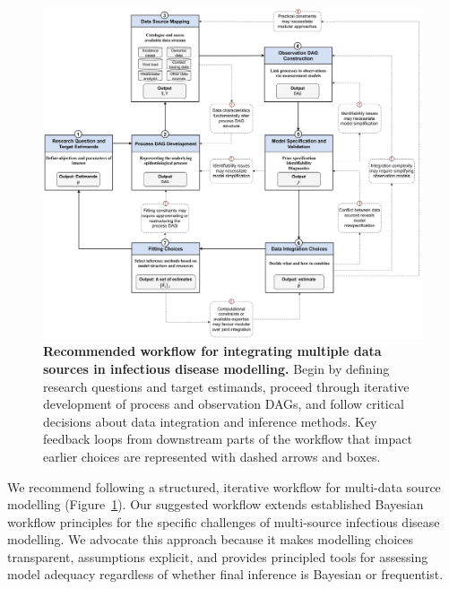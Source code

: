 \documentclass{article}
\begin{document}
\begin{figure}[htbp]
    \centering
    \includegraphics[width=\textwidth]{figures/core steps with more details.drawio.pdf}
    \caption{\textbf{Recommended workflow for integrating multiple data sources in infectious disease modelling.} Begin by defining research questions and target estimands, proceed through iterative development of process and observation DAGs, and follow critical decisions about data integration and inference methods. Key feedback loops from downstream parts of the workflow that impact earlier choices are represented with dashed arrows and boxes.}
    \label{fig:workflow}
\end{figure}

We recommend following a structured, iterative workflow for multi-data source modelling (Figure~\ref{fig:workflow}). Our suggested workflow extends established Bayesian workflow principles \citep{gelman2020bayesian} for  the specific challenges of multi-source infectious disease modelling.
We advocate this approach because it makes modelling choices transparent, assumptions explicit, and provides principled tools for assessing model adequacy regardless of whether final inference is Bayesian or frequentist.
\end{document}
